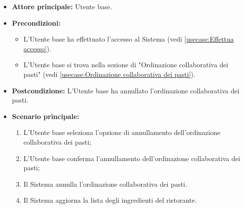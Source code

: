 \label{usecase:Annullamento dell'ordinazione}
\begin{itemize}
	\item \textbf{Attore principale:} Utente base.

	\item \textbf{Precondizioni:}
	\begin{itemize}
		\item L'Utente base ha effettuato l'accesso al Sistema (vedi \autoref{usecase:Effettua accesso}).
		\item L'Utente base si trova nella sezione di "Ordinazione collaborativa dei pasti" (vedi \autoref{usecase:Ordinazione collaborativa dei pasti}).
	\end{itemize}

	\item \textbf{Postcondizione:}
	      L'Utente base ha annullato l'ordinazione collaborativa dei pasti.

	\item \textbf{Scenario principale:}
	      \begin{enumerate}
		      \item L'Utente base seleziona l'opzione di annullamento
		            dell'ordinazione collaborativa dei pasti;

		      \item L'Utente base conferma l'annullamento dell'ordinazione
		            collaborativa dei pasti;

		      \item Il Sistema annulla l'ordinazione collaborativa dei pasti.
		      \item Il Sistema aggiorna la lista degli ingredienti del ristorante.
	      \end{enumerate}
\end{itemize}
